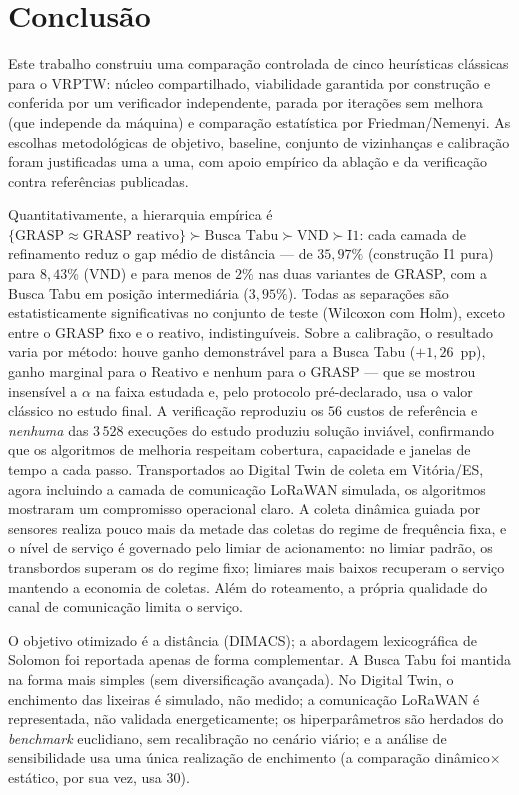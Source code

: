 \documentclass[12pt, a4paper]{article}
\begin{document}
\section{Conclusão}\label{sec:conclusao}
Este trabalho construiu uma comparação controlada de cinco heurísticas clássicas para o VRPTW: núcleo compartilhado, viabilidade garantida por construção e conferida por um verificador independente, parada por iterações sem melhora (que independe da máquina) e comparação estatística por Friedman/Nemenyi. As escolhas metodológicas de objetivo, baseline, conjunto de vizinhanças e calibração foram justificadas uma a uma, com apoio empírico da ablação e da verificação contra referências publicadas.

Quantitativamente, a hierarquia empírica é $\{\text{GRASP} \approx \text{GRASP reativo}\} \succ \text{Busca Tabu} \succ \text{VND} \succ \text{I1}$: cada camada de refinamento reduz o gap médio de distância --- de $35{,}97\%$ (construção I1 pura) para $8{,}43\%$ (VND) e para menos de $2\%$ nas duas variantes de GRASP, com a Busca Tabu em posição intermediária ($3{,}95\%$). Todas as separações são estatisticamente significativas no conjunto de teste (Wilcoxon com Holm), exceto entre o GRASP fixo e o reativo, indistinguíveis. Sobre a calibração, o resultado varia por método: houve ganho demonstrável para a Busca Tabu ($+1{,}26$~pp), ganho marginal para o Reativo e nenhum para o GRASP --- que se mostrou insensível a $\alpha$ na faixa estudada e, pelo protocolo pré-declarado, usa o valor clássico no estudo final. A verificação reproduziu os $56$ custos de referência e \emph{nenhuma} das $3\,528$ execuções do estudo produziu solução inviável, confirmando que os algoritmos de melhoria respeitam cobertura, capacidade e janelas de tempo a cada passo. Transportados ao Digital Twin de coleta em Vitória/ES, agora incluindo a camada de comunicação LoRaWAN simulada, os algoritmos mostraram um compromisso operacional claro. A coleta dinâmica guiada por sensores realiza pouco mais da metade das coletas do regime de frequência fixa, e o nível de serviço é governado pelo limiar de acionamento: no limiar padrão, os transbordos superam os do regime fixo; limiares mais baixos recuperam o serviço mantendo a economia de coletas. Além do roteamento, a própria qualidade do canal de comunicação limita o serviço.

O objetivo otimizado é a distância (DIMACS); a abordagem lexicográfica de Solomon foi reportada apenas de forma complementar. A Busca Tabu foi mantida na forma mais simples (sem diversificação avançada). No Digital Twin, o enchimento das lixeiras é simulado, não medido; a comunicação LoRaWAN é representada, não validada energeticamente; os hiperparâmetros são herdados do \textit{benchmark} euclidiano, sem recalibração no cenário viário; e a análise de sensibilidade usa uma única realização de enchimento (a comparação dinâmico$\times$estático, por sua vez, usa 30).
\end{document}
